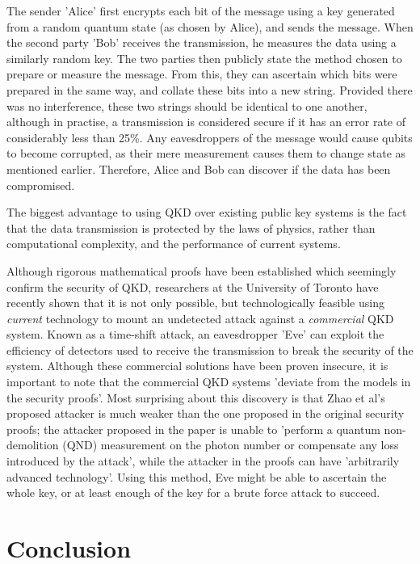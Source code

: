\documentclass[runningheads,a4paper]{llncs}
\begin{document}
The sender 'Alice' first encrypts each bit of the message using a key generated from a random quantum state (as chosen by Alice), and sends the message. When the second party 'Bob' receives the transmission, he measures the data using a similarly random key. The two parties then publicly state the method chosen to prepare or measure the message. From this, they can ascertain which bits were prepared in the same way, and collate these bits into a new string. Provided there was no interference, these two strings should be identical to one another, although in practise, a transmission is considered secure if it has an error rate of considerably less than 25\%\cite{Steane:1997zr}. Any eavesdroppers of the message would cause qubits to become corrupted, as their mere measurement causes them to change state as mentioned earlier. Therefore, Alice and Bob can discover if the data has been compromised.

The biggest advantage to using QKD over existing public key systems is the fact that the data transmission is protected by the laws of physics, rather than computational complexity, and the performance of current systems.

Although rigorous mathematical proofs have been established which seemingly confirm the security of QKD\cite{Deutsch:1996fk}\cite{Shor:2000uq}, researchers at the University of Toronto have recently shown that it is not only possible, but technologically feasible using \emph{current} technology to mount an undetected attack against a \emph{commercial} QKD system. Known as a time-shift attack, an eavesdropper 'Eve' can exploit the efficiency of detectors used to receive the transmission to break the security of the system\cite{Zhao:2008fk}. Although these commercial solutions have been proven insecure, it is important to note that the commercial QKD systems 'deviate from the models in the security proofs'\cite{Lydersen:2010qy}. Most surprising about this discovery is that Zhao et al's proposed attacker is much weaker than the one proposed in the original security proofs; the attacker proposed in the paper is unable to 'perform a quantum non-demolition (QND) measurement on the photon number or compensate any loss introduced by the attack', while the attacker in the proofs can have 'arbitrarily advanced technology'. Using this method, Eve might be able to ascertain the whole key, or at least enough of the key for a brute force attack to succeed.

\section{Conclusion}
\end{document}

